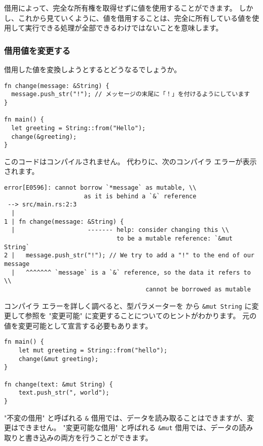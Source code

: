 借用によって、完全な所有権を取得せずに値を使用することができます。 しかし、これから見ていくように、値を借用することは、完全に所有している値を使用して実行できる処理が全部できるわけではないことを意味します。

\subsubsection{借用値を変更する}

借用した値を変換しようとするとどうなるでしょうか。

\begin{lstlisting}[numbers=none]
fn change(message: &String) {
  message.push_str("!"); // メッセージの末尾に「！」を付けるようにしています
}

fn main() {
  let greeting = String::from("Hello");
  change(&greeting); 
}
\end{lstlisting}

このコードはコンパイルされません。 代わりに、次のコンパイラ エラーが表示されます。

\begin{lstlisting}[numbers=none]
error[E0596]: cannot borrow `*message` as mutable, \\
                      as it is behind a `&` reference
 --> src/main.rs:2:3
  |
1 | fn change(message: &String) {
  |                    ------- help: consider changing this \\
                               to be a mutable reference: `&mut String`
2 |   message.push_str("!"); // We try to add a "!" to the end of our message
  |   ^^^^^^^ `message` is a `&` reference, so the data it refers to \\
                                       cannot be borrowed as mutable
\end{lstlisting}

コンパイラ エラーを詳しく調べると、型パラメーターを から \texttt{\&mut String} に変更して参照を "変更可能" に変更することについてのヒントがわかります。 元の値を変更可能として宣言する必要もあります。

\begin{lstlisting}[numbers=none]
fn main() {
    let mut greeting = String::from("hello");
    change(&mut greeting);
}

fn change(text: &mut String) {
    text.push_str(", world");
}
\end{lstlisting}

"不変の借用" と呼ばれる \texttt{\&} 借用では、データを読み取ることはできますが、変更はできません。 "変更可能な借用" と呼ばれる \texttt{\&mut} 借用では、データの読み取りと書き込みの両方を行うことができます。

